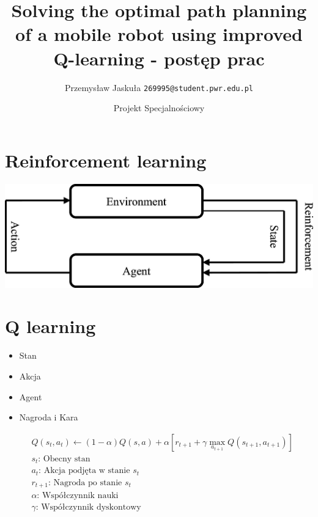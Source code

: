 \documentclass[aspectratio=169,15pt,]{beamer}
\title{Solving the optimal path planning of a mobile robot using improved Q-learning - postęp prac}
\institute{WYDZIAŁ ELEKTRONIKI, FOTONIKI I MIKROSYSTEMÓW}
\date{Projekt Specjalnościowy}
\author[Euclid]{Przemysław Jaskuła \texttt{269995@student.pwr.edu.pl}}
\begin{document}
\begin{frame}[plain]
\titlepage
\end{frame}
\begin{frame}
\tableofcontents
\end{frame}
\section{Reinforcement learning}
\begin{frame}
	\sectionpage

\end{frame}
\begin{frame}
\centering
	\includegraphics[width =\textwidth]{Obrazy/RL.jpg}
\end{frame}
\section{Q learning}
\begin{frame}
	\sectionpage

\end{frame}
\begin{frame}
\begin{itemize}
 \item<1-> \Huge{Stan}
 \item<2->\Huge{Akcja}
 \item<3-> \Huge{Agent}
 \item<4-> \Huge{Nagroda i Kara}
\end{itemize}
\end{frame}
\begin{frame}
	\centering
	\begin{align*}
	&Q(s_t,a_t) \leftarrow (1-\alpha)Q(s,a)+\alpha \left[ r_{t+1} +\gamma \max_{a_{t+1}} Q(s_{t+1},a_{t+1})\right ] \\
	&s_t  \text{: Obecny stan}\\
	&a_t \text{: Akcja podjęta w stanie }s_t\\
	&r_{t+1} \text{: Nagroda po stanie }s_t\\
	&\alpha \text{: Współczynnik nauki}\\
	& \gamma \text{: Współczynnik dyskontowy}
	\end{align*}


\end{frame}
\end{document}
